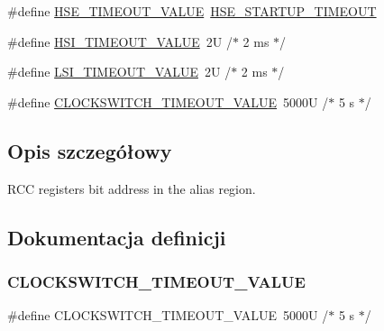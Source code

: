 \begin{DoxyCompactItemize}
\item 
\#define \hyperlink{group___r_c_c___bit_address___alias_region_gac0cd4ed24fa948844e1a40b12c450f32}{H\+S\+E\+\_\+\+T\+I\+M\+E\+O\+U\+T\+\_\+\+V\+A\+L\+UE}~\hyperlink{stm32f4xx__hal__conf_8h_a68ecbc9b0a1a40a1ec9d18d5e9747c4f}{H\+S\+E\+\_\+\+S\+T\+A\+R\+T\+U\+P\+\_\+\+T\+I\+M\+E\+O\+UT}
\item 
\#define \hyperlink{group___r_c_c___bit_address___alias_region_gad9e56670dcbbe9dbc3a8971b36bbec58}{H\+S\+I\+\_\+\+T\+I\+M\+E\+O\+U\+T\+\_\+\+V\+A\+L\+UE}~2\+U  /$\ast$ 2 ms $\ast$/
\item 
\#define \hyperlink{group___r_c_c___bit_address___alias_region_gad52c7f624c88b0c82ab41b9dbd2b347f}{L\+S\+I\+\_\+\+T\+I\+M\+E\+O\+U\+T\+\_\+\+V\+A\+L\+UE}~2\+U  /$\ast$ 2 ms $\ast$/
\item 
\#define \hyperlink{group___r_c_c___bit_address___alias_region_gab3caadc0f23d394d1033aba55d31fcdc}{C\+L\+O\+C\+K\+S\+W\+I\+T\+C\+H\+\_\+\+T\+I\+M\+E\+O\+U\+T\+\_\+\+V\+A\+L\+UE}~5000\+U /$\ast$ 5 s $\ast$/
\end{DoxyCompactItemize}


\subsection{Opis szczegółowy}
R\+CC registers bit address in the alias region. 



\subsection{Dokumentacja definicji}
\mbox{\label{group___r_c_c___bit_address___alias_region_gab3caadc0f23d394d1033aba55d31fcdc}} 
\subsubsection{\texorpdfstring{C\+L\+O\+C\+K\+S\+W\+I\+T\+C\+H\+\_\+\+T\+I\+M\+E\+O\+U\+T\+\_\+\+V\+A\+L\+UE}{CLOCKSWITCH\_TIMEOUT\_VALUE}}
{\footnotesize\ttfamily \#define C\+L\+O\+C\+K\+S\+W\+I\+T\+C\+H\+\_\+\+T\+I\+M\+E\+O\+U\+T\+\_\+\+V\+A\+L\+UE~5000\+U /$\ast$ 5 s $\ast$/}



